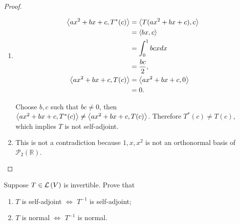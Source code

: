 \begin{proof}
    \begin{enumerate}[label={(\alph*)}]
        \item \begin{align*}
            \left\langle{ax^{2} + bx + c, T^{*}(c)}\right\rangle & = \left\langle{T(ax^{2} + bx + c), c}\right\rangle \\
            & = \left\langle{bx, c}\right\rangle \\
            & = \int^{1}_{0}bcx dx \\
            & = \frac{bc}{2}, \\
            \left\langle{ax^{2} + bx + c, T(c)}\right\rangle & = \left\langle{ax^{2} + bx + c, 0}\right\rangle \\
                                              & = 0.
        \end{align*}

        Choose $b, c$ such that $bc\ne 0$, then $\left\langle{ax^{2} + bx + c, T^{*}(c)}\right\rangle\ne \left\langle{ax^{2} + bx + c, T(c)}\right\rangle$. Therefore $T^{*}(c)\ne T(c)$, which implies $T$ is not self-adjoint.
        \item This is not a contradiction because $1, x, x^{2}$ is not an orthonormal basis of $\mathscr{P}_{2}(\mathbb{R})$.
    \end{enumerate}
\end{proof}
\newpage

\begin{exercise}
    Suppose $T\in\mathcal{L}\left({V}\right)$ is invertible. Prove that
    \begin{enumerate}[label={(\alph*)}]
        \item $T$ is self-adjoint $\Longleftrightarrow$ $T^{-1}$ is self-adjoint;
        \item $T$ is normal $\Longleftrightarrow$ $T^{-1}$ is normal.
    \end{enumerate}
\end{exercise}

